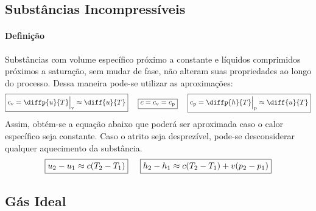 \documentclass{article}
\begin{document}
        \subsection{Substâncias Incompressíveis}
            \paragraph{Definição}Substâncias com volume específico próximo a constante e líquidos comprimidos próximos a saturação, sem mudar de fase, não alteram suas propriedades ao longo do processo. Dessa maneira pode-se utilizar as aproximações:
                \[
                    \boxed{c_{\text{v}} = \diffp{u}{T}\Big|_{\text{v}} \approx \diff{u}{T}} \hspace{5mm}
                    \boxed{c = c_{\text{v}} = c_{\text{p}}} \hspace{5mm}
                    \boxed{c_{\text{p}} = \diffp{h}{T}\Big|_{\text{p}} \approx \diff{u}{T}}
                \]
            Assim, obtém-se a equação abaixo que poderá ser aproximada caso o calor específico seja constante. Caso o atrito seja desprezível, pode-se desconsiderar qualquer aquecimento da substância.
                \[
                    \boxed{u_{2} - u_{1} \approx c (T_{2} - T_{1})} \hspace{5mm}
                    \boxed{h_{2} - h_{1} \approx c (T_{2} - T_{1}) + v(p_{2} - p_{1})}
                \]

        \subsection{Gás Ideal}
\end{document}
